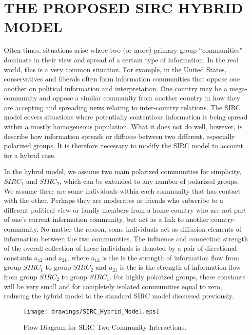 \chapter{THE PROPOSED SIRC HYBRID MODEL} \label{ch:SIRC_HYBRID} %

Often times, situations arise where two (or more) primary group ``communities" dominate in their view and spread of a certain type of information. In the real world, this is a very common situation. For example, in the United States, conservatives and liberals often form information communities that oppose one another on political information and interpretation. One country may be a mega-community and oppose a similar community from another country in how they are accepting and spreading news relating to inter-country relations. The SIRC model covers situations where potentially contentious information is being spread within a mostly homogeneous population. What it does not do well, however, is describe how information spreads or diffuses between two different, especially polarized groups. It is therefore necessary to modify the SIRC model to account for a hybrid case.

In the hybrid model, we assume two main polarized communities for simplicity, $SIRC_1$ and $SIRC_2$, which can be extended to any number of polarized groups. We assume there are some individuals within each community that has contact with the other. Perhaps they are moderates or friends who subscribe to a different political view or family members from a home country who are not part of one's current information community, but act as a link to another country-community. No matter the reason, some individuals act as diffusion elements of information between the two communities. The influence and connection strength of the overall collection of these individuals is denoted by a pair of directional constants $a_{12}$ and $a_{21}$, where $a_{12}$ is the is the strength of information flow from group $SIRC_1$ to  group $SIRC_2$ and $a_{21}$ is the is the strength of information flow from group $SIRC_2$ to  group $SIRC_1$. For highly polarized groups, these constants will be very small and for completely isolated communities equal to zero, reducing the hybrid model to the standard SIRC model discussed previously. 
\begin{figure}[!htbp] \centering
  \texttt{[image: drawings/SIRC\_Hybrid\_Model.eps]}
  \caption{Flow Diagram for SIRC Two-Community Interactions.}
  \label{fig:sirc__hybrid_flow}
\end{figure}

